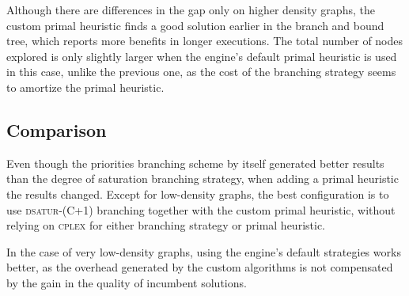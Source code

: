 Although there are differences in the gap only on higher density graphs, the custom primal heuristic finds a good solution earlier in the branch and bound tree, which reports more benefits in longer executions. The total number of nodes explored is only slightly larger when the engine's default primal heuristic is used in this case, unlike the previous one, as the cost of the branching strategy seems to amortize the primal heuristic. 

\subsection{Comparison}

Even though the priorities branching scheme by itself generated better results than the degree of saturation branching strategy, when adding a primal heuristic the results changed. Except for low-density graphs, the best configuration is to use \textsc{dsatur-(C+1)} branching together with the custom primal heuristic, without relying on \textsc{cplex} for either branching strategy or primal heuristic. 

In the case of very low-density graphs, using the engine's default strategies works better, as the overhead generated by the custom algorithms is not compensated by the gain in the quality of incumbent solutions. 